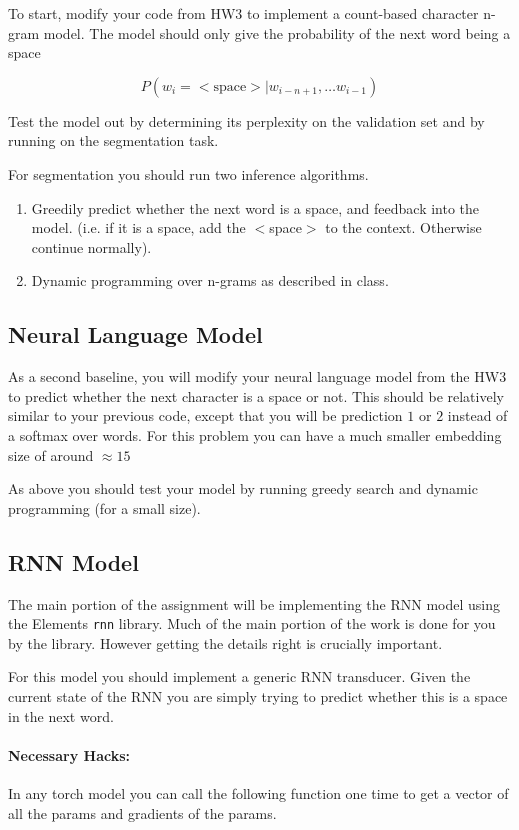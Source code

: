 \documentclass[11pt]{article}
\begin{document}
To start, modify your code from HW3
to implement a count-based character n-gram model. 
The model should only give the probability of the next 
word being a space  

\[ P(w_i =<\mathrm{space}> | w_{i-n+1}, \ldots w_{i-1}) \]

Test the model out by determining its perplexity on 
the validation set and by running on the segmentation task. 

For segmentation you should run two inference algorithms. 

\begin{enumerate}
\item Greedily predict whether the next word is a space, and feedback 
  into the model. (i.e. if it is a space, add the $<$space$>$ to the context. Otherwise continue normally).

\item Dynamic programming over n-grams as described in class. 
\end{enumerate}

\subsection{Neural Language Model}

As a second baseline, you will modify your neural language 
model from the HW3 to predict whether the next character is a 
space or not. This should be relatively similar to your previous 
code, except that you will be prediction $1$ or $2$ instead 
of a softmax over words. For this problem you can have a much smaller embedding 
size of around $\approx 15$ 

As above you should test your model 
by running greedy search and dynamic programming (for a small size). 

\subsection{RNN Model}

The main portion of the assignment will be implementing the 
RNN model using the Elements \texttt{rnn} library. Much of the 
main portion of the work is done for you by the library. However 
getting the details right is crucially important. 

For this model you should implement a generic RNN transducer. 
Given the current state of the RNN you are simply trying to predict 
whether this is a space in the next word. 

\paragraph{Necessary Hacks:}
In any torch model you can call the following function one time to get 
a vector of all the params and gradients of the params. 
\end{document}
